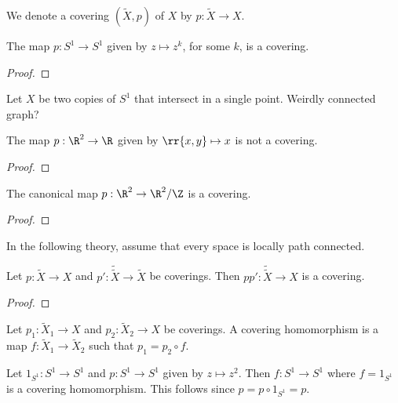 \documentclass{article}
\begin{document}
\begin{notation}
  We denote a covering $(\tilde X,p)$ of $X$ by $p:\tilde X\to X$.
\end{notation}

\begin{example}
  The map $p:S^1\to S^1$ given by $z\mapsto z^k$, for some $k$, is a covering.
  \begin{proof}
    \missingproof
  \end{proof}
\end{example}

\begin{example}
  Let $X$ be two copies of $S^1$ that intersect in a single point. Weirdly connected
  graph?
\end{example}

\begin{nonexample}
  The map $p:\R^2\to\R$ given by $\rr{x,y}\mapsto x$ is not a covering.
  \begin{proof}
    \missingproof
  \end{proof}
\end{nonexample}

\begin{example}
  The canonical map $p:\R^2\to\R^2/\Z$ is a covering.
  \begin{proof}
    \missingproof
  \end{proof}
\end{example}

In the following theory, assume that every space is locally path connected.

\begin{proposition}
  Let $p:\tilde X\to X$ and $p':\tilde{\tilde X}\to\tilde X$ be coverings.
  Then $pp':\tilde{\tilde{X}}\to X$ is a covering.
  \begin{proof}
    \missingproof
  \end{proof}
\end{proposition}

\begin{definition}
  Let $p_1:\tilde X_1\to X$ and $p_2:\tilde X_2\to X$ be coverings. A covering homomorphism
  is a map $f:\tilde X_1\to\tilde X_2$ such that $p_1 = p_2\circ f$.
\end{definition}

\begin{example}
  Let $1_{S^1} : S^1 \to S^1$ and $p : S^1 \to S^1$  given by $z \mapsto z^2$. 
  Then $f : S^1 \to S^1$ where $f = 1_{S^1}$ is a covering homomorphism.
  This follows since $p = p \circ 1_{S^1} = p$. 
\end{example}
\end{document}
